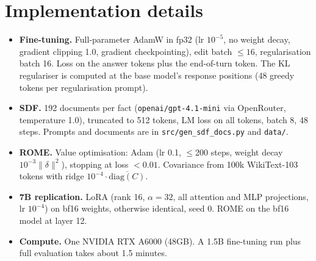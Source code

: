 \begin{table}[h]
\centering\small
\caption{Truth probe at layer 20 (seed 0). ctrl acc = held-out accuracy on control statements (\%).}
\label{tab:probe}
\resizebox{\linewidth}{!}{}
\end{table}

\section{Implementation details}
\label{app:impl}
\begin{itemize}
\item \textbf{Fine-tuning.} Full-parameter AdamW in fp32 (lr $10^{-5}$, no weight decay, gradient clipping 1.0, gradient checkpointing), edit batch $\le16$, regularisation batch 16. Loss on the answer tokens plus the end-of-turn token. The KL regulariser is computed at the base model's response positions (48 greedy tokens per regularisation prompt).
\item \textbf{SDF.} 192 documents per fact (\texttt{openai/gpt-4.1-mini} via OpenRouter, temperature 1.0), truncated to 512 tokens, LM loss on all tokens, batch 8, 48 steps. Prompts and documents are in \texttt{src/gen\_sdf\_docs.py} and \texttt{data/}.
\item \textbf{ROME.} Value optimisation: Adam (lr 0.1, $\le$200 steps, weight decay $10^{-3}\|\delta\|^2$), stopping at loss $<0.01$. Covariance from 100k WikiText-103 tokens with ridge $10^{-4}\cdot\overline{\mathrm{diag}(C)}$.
\item \textbf{7B replication.} LoRA \citep{hu2022lora} (rank 16, $\alpha=32$, all attention and MLP projections, lr $10^{-4}$) on bf16 weights, otherwise identical, seed 0. ROME on the bf16 model at layer 12.
\item \textbf{Compute.} One NVIDIA RTX A6000 (48GB). A 1.5B fine-tuning run plus full evaluation takes about 1.5 minutes.
\end{itemize}
